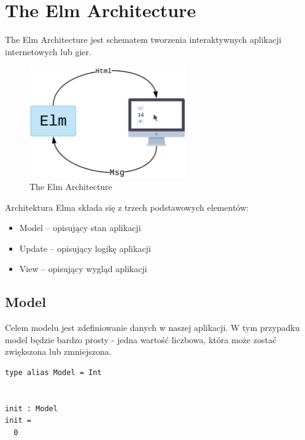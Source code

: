 \documentclass[twoside,a4paper]{book}
\begin{document}
\section{The Elm Architecture}
The Elm Architecture jest schematem tworzenia interaktywnych aplikacji internetowych lub gier.
\begin{figure}[h]
    \centering
    \includegraphics[width=0.6\textwidth]{elm_arch.png}
    \caption{The Elm Architecture}
    \label{fig:elm_arch}
\end{figure}

Architektura Elma składa się z trzech podstawowych elementów:
\begin{itemize}
    \setlength\itemsep{-0.1em}
    \item Model -- opisujący stan aplikacji
    \item Update -- opisujący logikę aplikacji
    \item View -- opisujący wygląd aplikacji
\end{itemize}


\subsection{Model}
\begin{minipage}{.55\textwidth}
Celem modelu jest zdefiniowanie danych w naszej aplikacji. W tym przypadku model będzie bardzo prosty - jedna wartość liczbowa, która może zostać zwiększona lub zmniejszona.
\end{minipage}\hfill
\begin{minipage}{.35\textwidth}
\lstset{frame=single}
\begin{lstlisting}[caption={Model},label=kod:Model]
type alias Model = Int


init : Model
init =
  0
\end{lstlisting}
\end{minipage}\hfill
\end{document}
